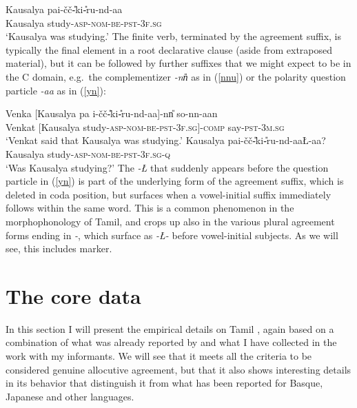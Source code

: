 \documentclass[output=paper, modfonts, nonflat]{langsci/langscibook}
\begin{document}
\ea\label{prog}\gll Kausalya pa\D i-\v{c}\v{c}\U-ki\textrtailt\textrtailt\U-ru-nd-aa\\
Kausalya study-\textsc{asp}-\textsc{nom}-\textsc{be}-\textsc{pst}-3\textsc{f.sg}\\
\glt `Kausalya was studying.'
\z
%
The finite verb, terminated by the agreement suffix, is typically the
final element in a root declarative clause (aside from extraposed
material), but it can be followed by further suffixes that we might
expect to be in the C domain, e.g.\ the complementizer \textit{-nn\U}
as in (\ref{nnu}) or the polarity question particle \textit{-aa} as in
(\ref{yn}):

\ea
  \ea\label{nnu}\gll Venka\textrtailt{} [Kausalya pa\D
  i-\v{c}\v{c}\U-ki\textrtailt\textrtailt\U-ru-nd-aa]-nn\U{} so-nn-aan\\
  Venkat [Kausalya
  study-\textsc{asp}-\textsc{nom}-\textsc{be}-\textsc{pst}-3\textsc{f.sg}]-\textsc{comp}{}
  say-\textsc{pst}-3\textsc{m.sg}\\
  \glt `Venkat said that Kausalya was studying.'
  \ex\label{yn}\gll Kausalya pa\D i-\v{c}\v{c}\U-ki\textrtailt\textrtailt\U-ru-nd-aa\L-aa?\\
  Kausalya study-\textsc{asp}-\textsc{nom}-\textsc{be}-\textsc{pst}-3\textsc{f.sg}-\textsc{q}\\
  \glt `Was Kausalya studying?'
  \z
\z
%
The \textit{-\L} that suddenly appears before the question particle in
(\ref{yn}) is part of the underlying form of the agreement suffix,
which is deleted in coda position, but surfaces when a vowel-initial
suffix immediately follows within the same word. This is a common
phenomenon in the morphophonology of Tamil, and crops up also in the
various plural agreement forms ending in \textit{-\nga}, which surface
as \textit{-\nga \L-} before vowel-initial subjects. As we will see,
this includes \allagr{} marker.


\section{The core data}

In this section I will present the empirical details on Tamil \allagr,
again based on a combination of what was already reported by
\citet{amrit:1991} and what I have collected in the work with my
informants. We will see that it meets all the criteria to be
considered genuine allocutive agreement, but that it also shows
interesting details in its behavior that distinguish it from what has
been reported for Basque, Japanese and other languages.
\end{document}
